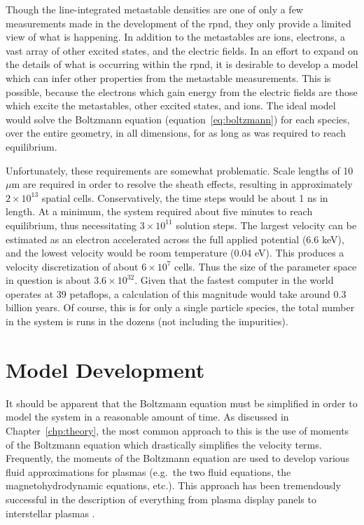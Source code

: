 Though the line-integrated metastable densities are one of only a few
measurements made in the development of the \acs{rpnd}, they only provide a
limited view of what is happening. In addition to the metastables are ions,
electrons, a vast array of other excited states, and the electric fields. In an
effort to expand on the details of what is occurring within the \acs{rpnd}, it
is desirable to develop a model which can infer other properties from the
metastable measurements. This is possible, because the electrons which gain
energy from the electric fields are those which excite the metastables, other
excited states, and ions. The ideal model would solve the Boltzmann equation
(equation~\ref{eq:boltzmann}) for each species, over the entire geometry, in all
dimensions, for as long as was required to reach equilibrium.

Unfortunately, these requirements are somewhat problematic. Scale lengths of 10
$\mu$m are required in order to resolve the sheath effects, resulting in
approximately $2\times10^{13}$ spatial cells. Conservatively, the time steps
would be about 1 ns in length. At a minimum, the system required about five
minutes to reach equilibrium, thus necessitating $3\times10^{11}$ solution
steps. The largest velocity can be estimated as an electron accelerated across
the full applied potential (6.6 keV), and the lowest velocity would be room
temperature (0.04 eV). This produces a velocity discretization of about
$6\times10^7$ cells. Thus the size of the parameter space in question is about
$3.6\times10^{32}$. Given that the fastest computer in the world operates at 39
petaflops, a calculation of this magnitude would take around 0.3 billion years.
Of course, this is for only a single particle species, the total number in the
system is runs in the dozens (not including the impurities).

\section{Model Development}

It should be apparent that the Boltzmann equation must be simplified in order to
model the system in a reasonable amount of time. As discussed in
Chapter~\ref{chp:theory}, the most common approach to this is the use of moments
of the Boltzmann equation which drastically simplifies the velocity terms.
Frequently, the moments of the Boltzmann equation are used to develop various
fluid approximations for plasmas \cite{Chen1984} (e.g.\ the two fluid equations,
the magnetohydrodynamic equations, etc.). This approach has been tremendously
successful in the description of everything from plasma display panels
\cite{Rauf1999b} to interstellar plasmas \cite{Linde1998}.

